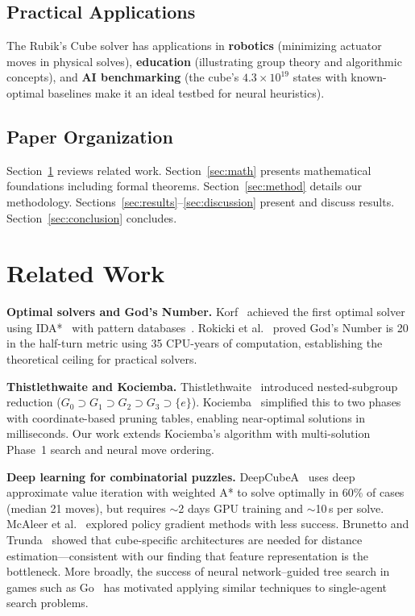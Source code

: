 \documentclass[conference]{IEEEtran}
\begin{document}
\subsection{Practical Applications}
The Rubik's Cube solver has applications in \textbf{robotics} (minimizing actuator moves in physical solves), \textbf{education} (illustrating group theory and algorithmic concepts), and \textbf{AI benchmarking} (the cube's $4.3 \times 10^{19}$ states with known-optimal baselines make it an ideal testbed for neural heuristics).

\subsection{Paper Organization}
Section~\ref{sec:related} reviews related work. Section~\ref{sec:math} presents mathematical foundations including formal theorems. Section~\ref{sec:method} details our methodology. Sections~\ref{sec:results}--\ref{sec:discussion} present and discuss results. Section~\ref{sec:conclusion} concludes.

\section{Related Work}
\label{sec:related}

\textbf{Optimal solvers and God's Number.}
Korf~\cite{korf1997} achieved the first optimal solver using IDA*~\cite{korf1985} with pattern databases~\cite{culberson1998}. Rokicki et al.~\cite{godnumber} proved God's Number is 20 in the half-turn metric using 35 CPU-years of computation, establishing the theoretical ceiling for practical solvers.

\textbf{Thistlethwaite and Kociemba.}
Thistlethwaite~\cite{thistlethwaite1981} introduced nested-subgroup reduction ($G_0 \supset G_1 \supset G_2 \supset G_3 \supset \{e\}$). Kociemba~\cite{kociemba} simplified this to two phases with coordinate-based pruning tables, enabling near-optimal solutions in milliseconds. Our work extends Kociemba's algorithm with multi-solution Phase~1 search and neural move ordering.

\textbf{Deep learning for combinatorial puzzles.}
DeepCubeA~\cite{deepcubea} uses deep approximate value iteration with weighted A* to solve optimally in 60\% of cases (median 21 moves), but requires $\sim$2 days GPU training and $\sim$10\,s per solve. McAleer et al.~\cite{mcaleer2018} explored policy gradient methods with less success. Brunetto and Trunda~\cite{brunetto2017} showed that cube-specific architectures are needed for distance estimation---consistent with our finding that feature representation is the bottleneck. More broadly, the success of neural network--guided tree search in games such as Go~\cite{silver2016, silver2017} has motivated applying similar techniques to single-agent search problems.
\end{document}
